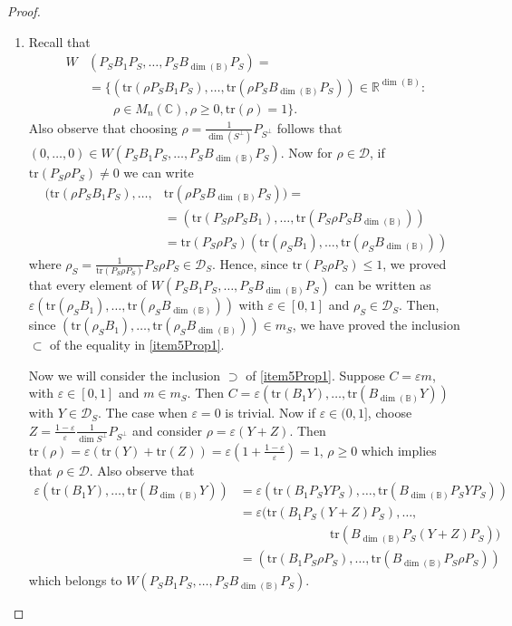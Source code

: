 \documentclass[10pt,a4paper]{amsart}
\def\C{\mathbb C}
\def\R{\mathbb R}
\def\calD{\mathcal D}
\def\tr{\text{tr}}
\begin{document}
\begin{proof}
\begin{enumerate}
	
	\item[\ref{item4Prop1} $\Rightarrow$ \ref{item5Prop1}.] 
	Recall that
	\begin{equation*}
		\begin{split}
			W&(P_SB_1P_S,\dots,P_SB_{{\dim(\mathbb{B})}}P_S)=\\
			&=\{\left(\tr(\rho P_SB_1P_S), \dots, \tr(\rho P_SB_{\dim(\mathbb{B})}P_S)\right)\in\R^{\dim(\mathbb{B})}:
			 \\&  
			\qquad \rho\in M_n(\C),\rho\geq 0, \tr(\rho)=1\}.
		\end{split}
	\end{equation*} 
	Also observe that choosing $\rho=\frac1{\dim(S^\perp)}P_{S^\perp}$ follows that $(0,\dots,0)\in W(P_SB_1P_S,\dots,P_SB_{{\dim(\mathbb{B})}}P_S)$. Now for $\rho\in\mathcal{D}$, if $\tr(P_S\rho P_S)\neq 0$ we can write
	\begin{equation*}
		\begin{split}
			(\tr(\rho P_SB_1 P_S),\dots,&\tr(\rho P_SB_{\dim(\mathbb{B})} P_S))=\\
			&=(\tr(P_S\rho P_SB_1 ),\dots,\tr(P_S\rho P_SB_{\dim(\mathbb{B})}))\\
			&=
			\tr(P_S\rho P_S)(\tr(\rho_S B_1 ),\dots,\tr(\rho_S B_{\dim(\mathbb{B})}))		
		\end{split}
	\end{equation*}
	where $\rho_S=\frac1{\tr(P_S\rho P_S)}P_S\rho P_S\in \calD_S$. Hence, since $\tr(P_S\rho P_S)\leq 1$, we proved that every element of $W(P_SB_1P_S,\dots,P_SB_{{\dim(\mathbb{B})}}P_S)$ can be written as $\varepsilon(\tr(\rho_S B_1 ),\dots,\tr(\rho_S B_{\dim(\mathbb{B})}))$ with $\varepsilon\in[0,1]$ and $\rho_S\in \calD_S$. Then, since $(\tr(\rho_S B_1 ),\dots,\tr(\rho_S B_{\dim(\mathbb{B})}))\in m_S$, we have proved the inclusion $\subset$ of the equality in \ref{item5Prop1}.
	
	Now we will consider the inclusion $\supset$ of \ref{item5Prop1}. Suppose $C=\varepsilon m$, with $\varepsilon\in[0,1]$ and $m\in m_S$. Then $C=\varepsilon (\tr(B_1 Y),\dots ,\tr(B_{\dim(\mathbb{B})} Y))$ with $Y\in\calD_S$. The case when $\varepsilon=0$ is trivial. Now if $\varepsilon\in(0,1]$, choose $Z= \frac{1-\varepsilon}{\varepsilon} \frac1{\dim S^\perp}P_{S^\perp}$ and consider $\rho=\varepsilon(Y+Z)$. Then $\tr(\rho)=\varepsilon (\tr(Y)+\tr(Z))=\varepsilon (1+\frac{1-\varepsilon}{\varepsilon})=1$, $\rho\geq 0$ which implies that $\rho\in\calD$. Also observe that
	\begin{equation*}
		\begin{split}
			\varepsilon(\tr(B_1 Y),\dots ,\tr(B_{\dim(\mathbb{B})} Y))&=
			\varepsilon(\tr(B_1 P_S Y P_S),\dots ,\tr(B_{\dim(\mathbb{B})} P_SY P_S)) \\
			&=\varepsilon
			(\tr(B_1 P_S (Y+Z) P_S),\dots ,\\
			& \hspace{3cm} \tr(B_{\dim(\mathbb{B})} P_S(Y+Z) P_S))\\
			&=(\tr(B_1 P_S \rho P_S),\dots ,\tr(B_{\dim(\mathbb{B})} P_S\rho P_S))
			\end{split}
	\end{equation*}
	which belongs to $W(P_SB_1P_S,\dots,P_SB_{{\dim(\mathbb{B})}}P_S)$.
	

\end{enumerate}
\end{proof}
\end{document}
